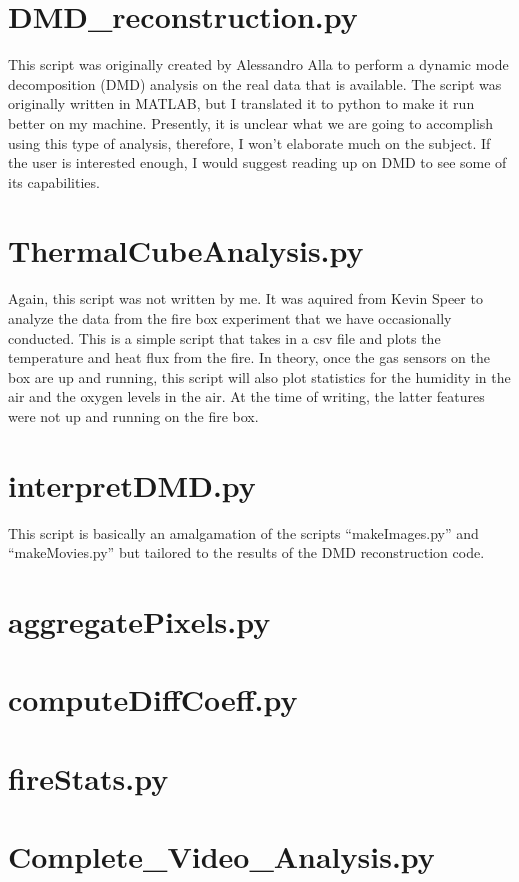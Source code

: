\documentclass{article}
\begin{document}
\section{DMD\_reconstruction.py}

This script was originally created by Alessandro Alla to perform a dynamic mode decomposition (DMD) analysis on the real data that is available. The script was originally written in MATLAB, but I translated it to python to make it run better on my machine. Presently, it is unclear what we are going to accomplish using this type of analysis, therefore, I won't elaborate much on the subject. If the user is interested enough, I would suggest reading up on DMD to see some of its capabilities. 

\section{ThermalCubeAnalysis.py}
Again, this script was not written by me. It was aquired from Kevin Speer to analyze the data from the fire box experiment that we have occasionally conducted. This is a simple script that takes in a csv file and plots the temperature and heat flux from the fire. In theory, once the gas sensors on the box are up and running, this script will also plot statistics for the humidity in the air and the oxygen levels in the air. At the time of writing, the latter features were not up and running on the fire box.

\section{interpretDMD.py}
This script is basically an amalgamation of the scripts ``makeImages.py'' and ``makeMovies.py'' but tailored to the results of the DMD reconstruction code. 

\section{aggregatePixels.py}

\section{computeDiffCoeff.py}

\section{fireStats.py}

\section{Complete\_Video\_Analysis.py}
\end{document}

